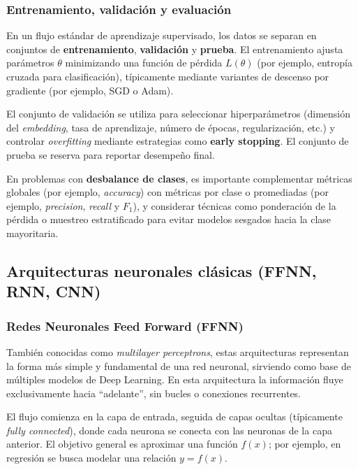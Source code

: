 \subsubsection{Entrenamiento, validación y evaluación}

En un flujo estándar de aprendizaje supervisado, los datos se separan en conjuntos de \textbf{entrenamiento}, \textbf{validación} y \textbf{prueba}. El entrenamiento ajusta parámetros $\theta$ minimizando una función de pérdida $L(\theta)$ (por ejemplo, entropía cruzada para clasificación), típicamente mediante variantes de descenso por gradiente (por ejemplo, SGD o Adam).

El conjunto de validación se utiliza para seleccionar hiperparámetros (dimensión del \textit{embedding}, tasa de aprendizaje, número de épocas, regularización, etc.) y controlar \textit{overfitting} mediante estrategias como \textbf{early stopping}. El conjunto de prueba se reserva para reportar desempeño final.

En problemas con \textbf{desbalance de clases}, es importante complementar métricas globales (por ejemplo, \textit{accuracy}) con métricas por clase o promediadas (por ejemplo, \textit{precision}, \textit{recall} y $F_1$), y considerar técnicas como ponderación de la pérdida o muestreo estratificado para evitar modelos sesgados hacia la clase mayoritaria.

\subsection{Arquitecturas neuronales clásicas (FFNN, RNN, CNN)}

\subsubsection{Redes Neuronales Feed Forward (FFNN)}

También conocidas como \textit{multilayer perceptrons}, estas arquitecturas representan la forma más simple y fundamental de una red neuronal, sirviendo como base de múltiples modelos de Deep Learning. En esta arquitectura la información fluye exclusivamente hacia ``adelante'', sin bucles o conexiones recurrentes.

El flujo comienza en la capa de entrada, seguida de capas ocultas (típicamente \textit{fully connected}), donde cada neurona se conecta con las neuronas de la capa anterior. El objetivo general es aproximar una función $f(x)$; por ejemplo, en regresión se busca modelar una relación $y=f(x)$.

